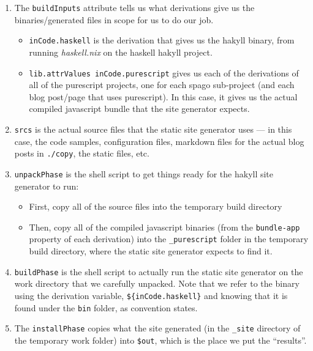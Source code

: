 \documentclass[]{article}
\begin{document}
\begin{enumerate}
\def\labelenumi{\arabic{enumi}.}
\tightlist
\item
  The \texttt{buildInputs} attribute tells us what derivations give us the
  binaries/generated files in scope for us to do our job.

  \begin{itemize}
  \tightlist
  \item
    \texttt{inCode.haskell} is the derivation that gives us the hakyll binary,
    from running \emph{haskell.nix} on the haskell hakyll project.
  \item
    \texttt{lib.attrValues\ inCode.purescript} gives us each of the derivations
    of all of the purescript projects, one for each spago sub-project (and each
    blog post/page that uses purescript). In this case, it gives us the actual
    compiled javascript bundle that the site generator expects.
  \end{itemize}
\item
  \texttt{srcs} is the actual source files that the static site generator uses
  --- in this case, the code samples, configuration files, markdown files for
  the actual blog posts in \texttt{./copy}, the static files, etc.
\item
  \texttt{unpackPhase} is the shell script to get things ready for the hakyll
  site generator to run:

  \begin{itemize}
  \tightlist
  \item
    First, copy all of the source files into the temporary build directory
  \item
    Then, copy all of the compiled javascript binaries (from the
    \texttt{bundle-app} property of each derivation) into the
    \texttt{\_purescript} folder in the temporary build directory, where the
    static site generator expects to find it.
  \end{itemize}
\item
  \texttt{buildPhase} is the shell script to actually run the static site
  generator on the work directory that we carefully unpacked. Note that we refer
  to the binary using the derivation variable, \texttt{\$\{inCode.haskell\}} and
  knowing that it is found under the \texttt{bin} folder, as convention states.
\item
  The \texttt{installPhase} copies what the site generated (in the
  \texttt{\_site} directory of the temporary work folder) into \texttt{\$out},
  which is the place we put the ``results''.
\end{enumerate}
\end{document}
